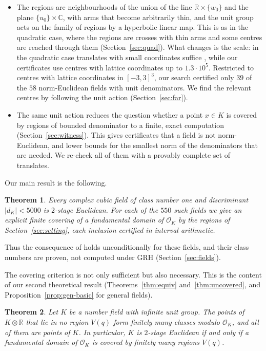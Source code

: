 \documentclass[11pt]{amsart}
\newtheorem{theorem}{Theorem}[section]
\theoremstyle{definition}
\theoremstyle{remark}
\numberwithin{equation}{section}
\newcommand{\R}{\mathbb{R}}
\newcommand{\C}{\mathbb{C}}
\newcommand{\cO}{\mathcal{O}}
\begin{document}
\begin{itemize}
\item The regions are neighbourhoods of the union of the line $\R\times\{w_0\}$ and the plane
$\{u_0\}\times\C$, with arms that become arbitrarily thin, and the unit group acts on the family
of regions by a hyperbolic linear map. This is as in the quadratic case, where the regions are
crosses with thin arms and some centres are reached through them (Section~\ref{sec:quad}). What
changes is the scale: in the quadratic case translates with small coordinates suffice
\cite{GM}, while our certificates use centres with lattice coordinates up to $1.3\cdot10^5$.
Restricted to centres with lattice coordinates in $[-3,3]^3$, our search certified only $39$
of the $58$ norm-Euclidean fields with unit denominators. We find the relevant centres by
following the unit action (Section~\ref{sec:far}).
\item The same unit action reduces the question whether a point $x\in K$ is covered by regions
of bounded denominator to a finite, exact computation (Section~\ref{sec:witness}). This gives
certificates that a field is not norm-Euclidean, and lower bounds for the smallest norm of the
denominators that are needed. We re-check all of them with a provably complete set of
translates.
\end{itemize}

Our main result is the following.

\begin{theorem}\label{thm:main}
Every complex cubic field of class number one and discriminant $|d_K|<5000$ is $2$-stage
Euclidean. For each of the $550$ such fields we give an explicit finite covering of a
fundamental domain of $\cO_K$ by the regions of Section~\ref{sec:setting}, each inclusion
certified in interval arithmetic.
\end{theorem}

Thus the consequence of \cite{CW} holds unconditionally for these fields, and their class
numbers are proven, not computed under GRH (Section~\ref{sec:fields}).

The covering criterion is not only sufficient but also necessary. This is the content of
our second theoretical result (Theorems~\ref{thm:equiv} and~\ref{thm:uncovered}, and
Proposition~\ref{prop:gen-basic} for general fields).

\begin{theorem}\label{thm:intro-equiv}
Let $K$ be a number field with infinite unit group. The points of $K\otimes\R$ that lie in no
region $V(q)$ form finitely many classes modulo $\cO_K$, and all of them are points of $K$. In
particular, $K$ is $2$-stage Euclidean if and only if a fundamental domain of $\cO_K$ is covered
by finitely many regions $V(q)$.
\end{theorem}
\end{document}
